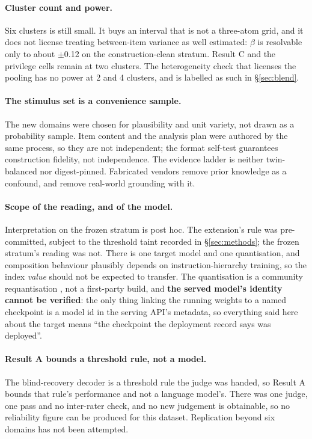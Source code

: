 \documentclass{article}
\begin{document}
\paragraph{Cluster count and power.} Six clusters is still small. It buys an
interval that is not a three-atom grid, and it does not license treating
between-item variance as well estimated: $\beta$ is resolvable only to about
$\pm$0.12 on the construction-clean stratum. Result C and the privilege cells
remain at two clusters. The heterogeneity check that licenses the pooling has
no power at 2 and 4 clusters, and is labelled as such in \S\ref{sec:blend}.

\paragraph{The stimulus set is a convenience sample.} The new domains were
chosen for plausibility and unit variety, not drawn as a probability sample.
Item content and the analysis plan were authored by the same process, so they
are not independent; the format self-test guarantees construction fidelity, not
independence. The evidence ladder is neither twin-balanced nor digest-pinned.
Fabricated vendors remove prior knowledge as a confound, and remove real-world
grounding with it.

\paragraph{Scope of the reading, and of the model.} Interpretation on the
frozen stratum is post hoc. The extension's rule was pre-committed, subject to
the threshold taint recorded in \S\ref{sec:methods}; the frozen stratum's
reading was not. There is one target model and one quantisation, and
composition behaviour plausibly depends on instruction-hierarchy training, so
the index \emph{value} should not be expected to transfer. The quantisation is a
community requantisation \cite{requant2026}, not a first-party build, and
\textbf{the served model's identity cannot be verified}: the only thing linking
the running weights to a named checkpoint is a model id in the serving API's
metadata, so everything said here about the target means ``the checkpoint the
deployment record says was deployed''.

\paragraph{Result A bounds a threshold rule, not a model.} The blind-recovery
decoder is a threshold rule the judge was handed, so Result A bounds that
rule's performance and not a language model's. There was one judge, one pass
and no inter-rater check, and no new judgement is obtainable, so no reliability
figure can be produced for this dataset. Replication beyond six domains has not
been attempted.
\end{document}
